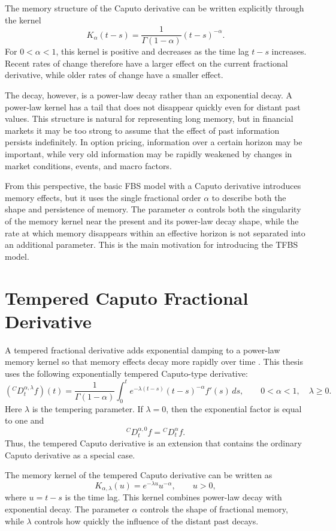 \documentclass[11pt,a4paper]{report}
\begin{document}
The memory structure of the Caputo derivative can be written explicitly through the kernel
\[
K_{\alpha}(t-s)
=
\frac{1}{\Gamma(1-\alpha)}(t-s)^{-\alpha}.
\]
For $0<\alpha<1$, this kernel is positive and decreases as the time lag $t-s$ increases. Recent rates of change therefore have a larger effect on the current fractional derivative, while older rates of change have a smaller effect.

The decay, however, is a power-law decay rather than an exponential decay. A power-law kernel has a tail that does not disappear quickly even for distant past values. This structure is natural for representing long memory, but in financial markets it may be too strong to assume that the effect of past information persists indefinitely. In option pricing, information over a certain horizon may be important, while very old information may be rapidly weakened by changes in market conditions, events, and macro factors.

From this perspective, the basic FBS model with a Caputo derivative introduces memory effects, but it uses the single fractional order $\alpha$ to describe both the shape and persistence of memory. The parameter $\alpha$ controls both the singularity of the memory kernel near the present and its power-law decay shape, while the rate at which memory disappears within an effective horizon is not separated into an additional parameter. This is the main motivation for introducing the TFBS model.

\section{Tempered Caputo Fractional Derivative}

A tempered fractional derivative adds exponential damping to a power-law memory kernel so that memory effects decay more rapidly over time \cite{SabzikarMeerschaertChen2015}. This thesis uses the following exponentially tempered Caputo-type derivative:
\[
({}^C D_t^{\alpha,\lambda} f)(t)
=
\frac{1}{\Gamma(1-\alpha)}
\int_0^t
e^{-\lambda(t-s)}
(t-s)^{-\alpha}
f'(s)\,ds,
\qquad 0<\alpha<1,
\quad \lambda\ge0.
\]
Here $\lambda$ is the tempering parameter. If $\lambda=0$, then the exponential factor is equal to one and
\[
{}^C D_t^{\alpha,0}f
=
{}^C D_t^\alpha f.
\]
Thus, the tempered Caputo derivative is an extension that contains the ordinary Caputo derivative as a special case.

The memory kernel of the tempered Caputo derivative can be written as
\[
K_{\alpha,\lambda}(u)
=
e^{-\lambda u}u^{-\alpha},
\qquad u>0,
\]
where $u=t-s$ is the time lag. This kernel combines power-law decay with exponential decay. The parameter $\alpha$ controls the shape of fractional memory, while $\lambda$ controls how quickly the influence of the distant past decays.
\end{document}
